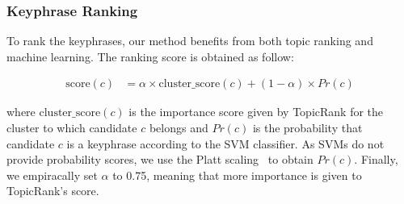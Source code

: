     \subsubsection{Keyphrase Ranking}
    \label{subsubsec:keyphrase_reranking}
      To rank the keyphrases, our method benefits from both topic ranking and
      machine learning. The ranking score is obtained as follow:

      \begin{footnotesize}
        \begin{align}
          \text{score}(c) &= \alpha \times \text{cluster\_score}(c) + (1 - \alpha) \times Pr(c)
        \end{align}
      \end{footnotesize}

      where $\text{cluster\_score}(c)$ is the importance score given by
      TopicRank for the cluster to which candidate $c$ belongs and $Pr(c)$ is
      the probability that candidate $c$ is a keyphrase according to the SVM
      classifier. As SVMs do not provide probability scores, we use the Platt
      scaling~\cite{platt1999probabilisticsvm} to obtain $Pr(c)$. Finally, we
      empiracally set $\alpha$ to 0.75, meaning that more importance is given to
      TopicRank's score.

